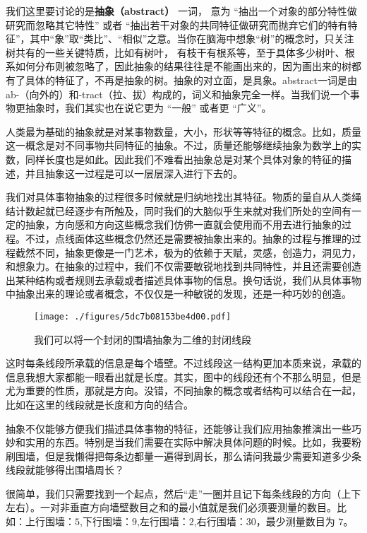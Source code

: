 
我们这里要讨论的是\textbf{抽象（abstract）} 一词， 意为 “抽出一个对象的部分特性做研究而忽略其它特性” 或者 “抽出若干对象的共同特征做研究而抛弃它们的特有特征”，其中“象”取“类比”、“相似”之意。当你在脑海中想象“树”的概念时，只关注树共有的一些关键特质，比如有树叶， 有枝干有根系等，至于具体多少树叶、根系如何分布则被忽略了，因此抽象的结果往往是不能画出来的，因为画出来的树都有了具体的特征了，不再是抽象的树。抽象的对立面，是具象。abstract一词是由ab-（向外的）和-tract（拉、拔）构成的，词义和抽象完全一样。当我们说一个事物更抽象时，我们其实也在说它更为 “一般” 或者更 “广义”。


人类最为基础的抽象就是对某事物数量，大小，形状等等特征的概念。比如，质量这一概念是对不同事物共同特征的抽象。不过，质量还能够继续抽象为数学上的实数，同样长度也是如此。因此我们不难看出抽象总是对某个具体对象的特征的描述，并且抽象这一过程是可以一层层深入进行下去的。

我们对具体事物抽象的过程很多时候就是归纳地找出其特征。物质的量自从人类绳结计数起就已经逐步有所触及，同时我们的大脑似乎生来就对我们所处的空间有一定的抽象，方向感和方向这些概念我们仿佛一直就会使用而不用去进行抽象的过程。不过，点线面体这些概念仍然还是需要被抽象出来的。抽象的过程与推理的过程截然不同，抽象更像是一门艺术，极为的依赖于天赋，灵感，创造力，洞见力，和想象力。在抽象的过程中，我们不仅需要敏锐地找到共同特性，并且还需要创造出某种结构或者规则去承载或者描述具体事物的信息。换句话说，我们从具体事物中抽象出来的理论或者概念，不仅仅是一种敏锐的发现，还是一种巧妙的创造。

\begin{figure}[ht]
\centering
\texttt{[image: ./figures/5dc7b08153be4d00.pdf]}
\caption{我们可以将一个封闭的围墙抽象为二维的封闭线段} \label{fig_Abstra_1}
\end{figure}

这时每条线段所承载的信息是每个墙壁。不过线段这一结构更加本质来说，承载的信息我想大家都能一眼看出就是长度。其实，图中的线段还有个不那么明显，但是尤为重要的性质，那就是方向。没错，不同抽象的概念或者结构可以结合在一起，比如在这里的线段就是长度和方向的结合。

抽象不仅能够方便我们描述具体事物的特征，还能够让我们应用抽象推演出一些巧妙和实用的东西。特别是当我们需要在实际中解决具体问题的时候。比如，我要粉刷围墙，但是我懒得把每条边都量一遍得到周长，那么请问我最少需要知道多少条线段就能够得出围墙周长？

很简单，我们只需要找到一个起点，然后“走”一圈并且记下每条线段的方向（上下左右）。一对非垂直方向墙壁数目之和的最小值就是我们必须要测量的数目。比如：上行围墙：$5$,下行围墙：$9$,左行围墙：$2$,右行围墙：$30$，最少测量数目为 $7$。

